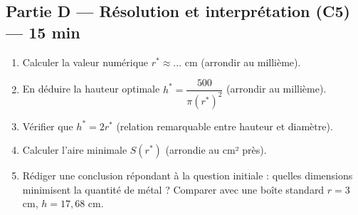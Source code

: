 
\bigskip

\subsection*{Partie D — Résolution et interprétation (C5) — 15 min}

\begin{enumerate}[resume]
  \item Calculer la valeur numérique $r^* \approx \ldots$ cm (arrondir au millième).
  \item En déduire la hauteur optimale $h^* = \dfrac{500}{\pi (r^*)^2}$ (arrondir au millième).
  \item Vérifier que $h^* = 2r^*$ (relation remarquable entre hauteur et diamètre).
  \item Calculer l'aire minimale $S(r^*)$ (arrondie au cm² près).
  \item Rédiger une conclusion répondant à la question initiale : quelles dimensions minimisent la quantité de métal ? Comparer avec une boîte standard $r = 3$ cm, $h = 17{,}68$ cm.
\end{enumerate}

